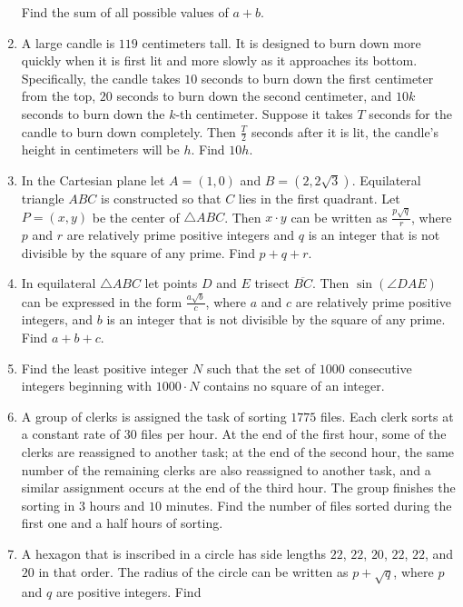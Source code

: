 \documentclass{article}
\begin{document}
\begin{enumerate}[label=\arabic*., itemsep=0.5em]
Find the sum of all possible values of \(a+b\).\par \vspace{0.5em}\item A large candle is \(119\) centimeters tall.  It is designed to burn down more quickly when it is first lit and more slowly as it approaches its bottom.  Specifically, the candle takes \(10\) seconds to burn down the first centimeter from the top, \(20\) seconds to burn down the second centimeter, and \(10k\) seconds to burn down the \(k\)-th centimeter.  Suppose it takes \(T\) seconds for the candle to burn down completely.  Then \(\tfrac{T}{2}\) seconds after it is lit, the candle's height in centimeters will be \(h\).  Find \(10h\).\par \vspace{0.5em}\item In the Cartesian plane let \(A = (1,0)\) and \(B = \left( 2, 2\sqrt{3} \right)\).  Equilateral triangle \(ABC\) is constructed so that \(C\) lies in the first quadrant.  Let \(P=(x,y)\) be the center of \(\triangle ABC\).  Then \(x \cdot y\) can be written as \(\tfrac{p\sqrt{q}}{r}\), where \(p\) and \(r\) are relatively prime positive integers and \(q\) is an integer that is not divisible by the square of any prime.  Find \(p+q+r\).\par \vspace{0.5em}\item In equilateral \(\triangle ABC\) let points \(D\) and \(E\) trisect \(\overline{BC}\). Then \(\sin(\angle DAE)\) can be expressed in the form \(\frac{a\sqrt{b}}{c}\), where \(a\) and \(c\) are relatively prime positive integers, and \(b\) is an integer that is not divisible by the square of any prime. Find \(a+b+c\).\par \vspace{0.5em}\item Find the least positive integer \(N\) such that the set of \(1000\) consecutive integers beginning with \(1000\cdot N\) contains no square of an integer.\par \vspace{0.5em}\item A group of clerks is assigned the task of sorting \(1775\) files. Each clerk sorts at a constant rate of \(30\) files per hour. At the end of the first hour, some of the clerks are reassigned to another task; at the end of the second hour, the same number of the remaining clerks are also reassigned to another task, and a similar assignment occurs at the end of the third hour. The group finishes the sorting in \(3\) hours and \(10\) minutes. Find the number of files sorted during the first one and a half hours of sorting.\par \vspace{0.5em}\item A hexagon that is inscribed in a circle has side lengths \(22\), \(22\), \(20\), \(22\), \(22\), and \(20\) in that order. The radius of the circle can be written as \(p+\sqrt{q}\), where \(p\) and \(q\) are positive integers. Find 
\end{enumerate}
\end{document}
